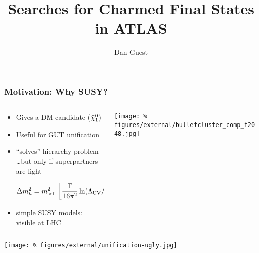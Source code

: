 \documentclass[usenames,dvipsnames]{beamer}
\title[Charmed Searches]{Searches for Charmed Final States in ATLAS}
\author[dhg3]{Dan Guest}
\institute[Yale]{Yale University}
\begin{document}
\maketitle

\begin{frame}
  \frametitle{Motivation: Why SUSY?}
  \begin{columns}
    \begin{column}{0.6\textwidth}
      \begin{itemize}
      \item Gives a DM candidate ($\tilde{\chi}_1^0$)
      \item Useful for GUT unification
      \item ``solves'' hierarchy  problem \\
        \ldots but only if superpartners are light
      \begin{tiny}
        \begin{equation*}
          \Delta m_{h}^2 = m_{\text{soft}}^2 \left[ \frac{\Gamma}{16 \pi^2} \ln(\Lambda_{\mathrm{UV}} / m_{\text{soft}}) + \ldots \right]
        \end{equation*}
      \end{tiny}
      \item simple SUSY models: visible at LHC
      \end{itemize}
    \end{column}
    \begin{column}{0.4\textwidth}
      \texttt{[image: \%
figures/external/bulletcluster\_comp\_f2048.jpg]} \\
    \end{column}
  \end{columns}
  \begin{center}
      \texttt{[image: \%
figures/external/unification-ugly.jpg]}
  \end{center}
\end{frame}
\end{document}
